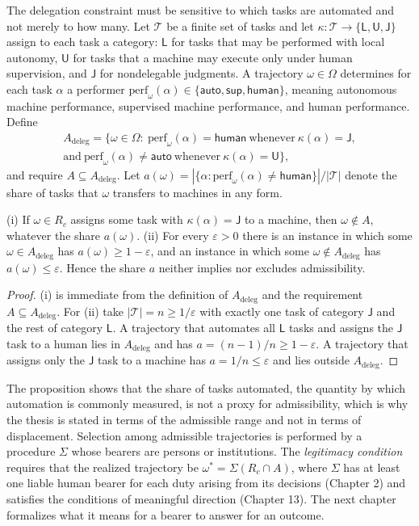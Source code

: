 The delegation constraint must be sensitive to which tasks are automated and not merely to how many. Let $\mathcal{T}$ be a finite set of tasks and let $\kappa:\mathcal{T}\to\{\mathsf{L},\mathsf{U},\mathsf{J}\}$ assign to each task a category: $\mathsf{L}$ for tasks that may be performed with local autonomy, $\mathsf{U}$ for tasks that a machine may execute only under human supervision, and $\mathsf{J}$ for nondelegable judgments. A trajectory $\omega\in\Omega$ determines for each task $\alpha$ a performer $\mathrm{perf}_\omega(\alpha)\in\{\mathsf{auto},\mathsf{sup},\mathsf{human}\}$, meaning autonomous machine performance, supervised machine performance, and human performance. Define
\begin{multline*}
A_{\mathrm{deleg}}=\big\{\omega\in\Omega:\ \mathrm{perf}_\omega(\alpha)=\mathsf{human}\ \text{whenever}\ \kappa(\alpha)=\mathsf{J},\\
\text{and}\ \mathrm{perf}_\omega(\alpha)\neq\mathsf{auto}\ \text{whenever}\ \kappa(\alpha)=\mathsf{U}\big\},
\end{multline*}
and require $A\subseteq A_{\mathrm{deleg}}$. Let $a(\omega)=|\{\alpha:\mathrm{perf}_\omega(\alpha)\neq\mathsf{human}\}|/|\mathcal{T}|$ denote the share of tasks that $\omega$ transfers to machines in any form.

\begin{proposition}
(i) If $\omega\in R_c$ assigns some task with $\kappa(\alpha)=\mathsf{J}$ to a machine, then $\omega\notin A$, whatever the share $a(\omega)$. (ii) For every $\varepsilon>0$ there is an instance in which some $\omega\in A_{\mathrm{deleg}}$ has $a(\omega)\ge1-\varepsilon$, and an instance in which some $\omega\notin A_{\mathrm{deleg}}$ has $a(\omega)\le\varepsilon$. Hence the share $a$ neither implies nor excludes admissibility.
\end{proposition}

\begin{proof}
(i) is immediate from the definition of $A_{\mathrm{deleg}}$ and the requirement $A\subseteq A_{\mathrm{deleg}}$. For (ii) take $|\mathcal{T}|=n\ge1/\varepsilon$ with exactly one task of category $\mathsf{J}$ and the rest of category $\mathsf{L}$. A trajectory that automates all $\mathsf{L}$ tasks and assigns the $\mathsf{J}$ task to a human lies in $A_{\mathrm{deleg}}$ and has $a=(n-1)/n\ge1-\varepsilon$. A trajectory that assigns only the $\mathsf{J}$ task to a machine has $a=1/n\le\varepsilon$ and lies outside $A_{\mathrm{deleg}}$.
\end{proof}

The proposition shows that the share of tasks automated, the quantity by which automation is commonly measured, is not a proxy for admissibility, which is why the thesis is stated in terms of the admissible range and not in terms of displacement. Selection among admissible trajectories is performed by a procedure $\Sigma$ whose bearers are persons or institutions. The \emph{legitimacy condition} requires that the realized trajectory be $\omega^\ast=\Sigma(R_c\cap A)$, where $\Sigma$ has at least one liable human bearer for each duty arising from its decisions (Chapter 2) and satisfies the conditions of meaningful direction (Chapter 13). The next chapter formalizes what it means for a bearer to answer for an outcome.
